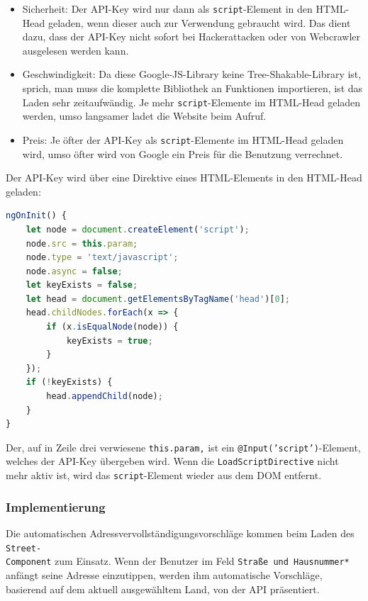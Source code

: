 \begin{itemize}
	
	\item Sicherheit: Der API-Key wird nur dann als \texttt{script}-Element in den HTML-Head geladen, wenn dieser auch zur Verwendung gebraucht wird. Das dient dazu, dass der API-Key nicht sofort bei Hackerattacken oder von Webcrawler ausgelesen werden kann.
	
	\item Geschwindigkeit: Da diese Google-JS-Library keine Tree-Shakable-Library ist, sprich, man muss die komplette Bibliothek an Funktionen importieren, ist das Laden sehr zeitaufwändig. Je mehr \texttt{script}-Elemente im HTML-Head geladen werden, umso langsamer ladet die Website beim Aufruf.
	
	\item Preis: Je öfter der API-Key als \texttt{script}-Elemente im HTML-Head geladen wird, umso öfter wird von Google ein Preis für die Benutzung verrechnet.
\end{itemize}

Der API-Key wird über eine Direktive eines HTML-Elements in den HTML-Head geladen:

\begin{lstlisting}[caption={Die \texttt{ngOnInit()}-Methode der \texttt{LoadScriptDirective}}, language=JavaScript,label={lst:gpac}]
ngOnInit() {
	let node = document.createElement('script');
	node.src = this.param;
	node.type = 'text/javascript';
	node.async = false;
	let keyExists = false;
	let head = document.getElementsByTagName('head')[0];
	head.childNodes.forEach(x => {
		if (x.isEqualNode(node)) {
			keyExists = true;
		}
	});
	if (!keyExists) {
		head.appendChild(node);
	}
}
\end{lstlisting}

Der, auf in Zeile drei verwiesene \texttt{this.param,} ist ein \texttt{@Input('script')}-Element, welches der API-Key übergeben wird. Wenn die \texttt{LoadScriptDirective} nicht mehr aktiv ist, wird das \texttt{script}-Element wieder aus dem DOM entfernt.

\subsubsection{Implementierung}
Die automatischen Adressvervollständigungsvorschläge kommen beim Laden des \texttt{Street-\\Component} zum Einsatz. Wenn der Benutzer im Feld \texttt{Straße und Hausnummer*} anfängt seine Adresse einzutippen, werden ihm automatische Vorschläge, basierend auf dem aktuell ausgewähltem Land, von der API präsentiert. 

